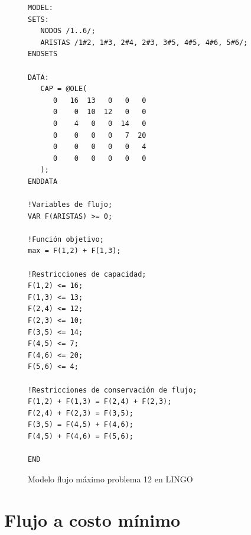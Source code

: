 \documentclass[12pt]{article}  %
\begin{document}
\begin{figure}[H]
	\centering
	\caption{Modelo flujo máximo problema 12 en LINGO}
	\label{fig:lingoProb12}
	\begin{verbatim}
MODEL:
SETS:
   NODOS /1..6/;
   ARISTAS /1#2, 1#3, 2#4, 2#3, 3#5, 4#5, 4#6, 5#6/;
ENDSETS

DATA:
   CAP = @OLE(
      0   16  13   0   0   0
      0    0  10  12   0   0
      0    4   0   0  14   0
      0    0   0   0   7  20
      0    0   0   0   0   4
      0    0   0   0   0   0
   );
ENDDATA

!Variables de flujo;
VAR F(ARISTAS) >= 0;

!Función objetivo;
max = F(1,2) + F(1,3);

!Restricciones de capacidad;
F(1,2) <= 16;
F(1,3) <= 13;
F(2,4) <= 12;
F(2,3) <= 10;
F(3,5) <= 14;
F(4,5) <= 7;
F(4,6) <= 20;
F(5,6) <= 4;

!Restricciones de conservación de flujo;
F(1,2) + F(1,3) = F(2,4) + F(2,3);
F(2,4) + F(2,3) = F(3,5);
F(3,5) = F(4,5) + F(4,6);
F(4,5) + F(4,6) = F(5,6);

END
	\end{verbatim}
\end{figure}

\section{Flujo a costo mínimo}
\end{document}
